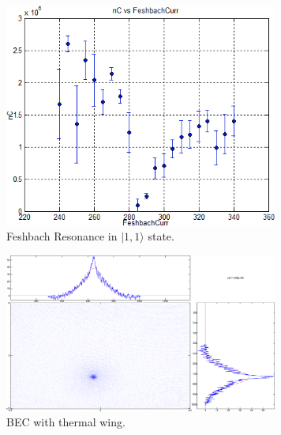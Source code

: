 \begin{figure}
  \begin{center}
    \includegraphics[width=9cm]{feshbach.png}
  \end{center}
  \caption{Feshbach Resonance in $|1, 1\rangle$ state.}
  \label{exp:feshbach}
\end{figure}

\begin{figure}
  \begin{center}
    \includegraphics[width=9cm]{bec.png}
  \end{center}
  \caption{BEC with thermal wing.}
  \label{exp:bec-image}
\end{figure}
